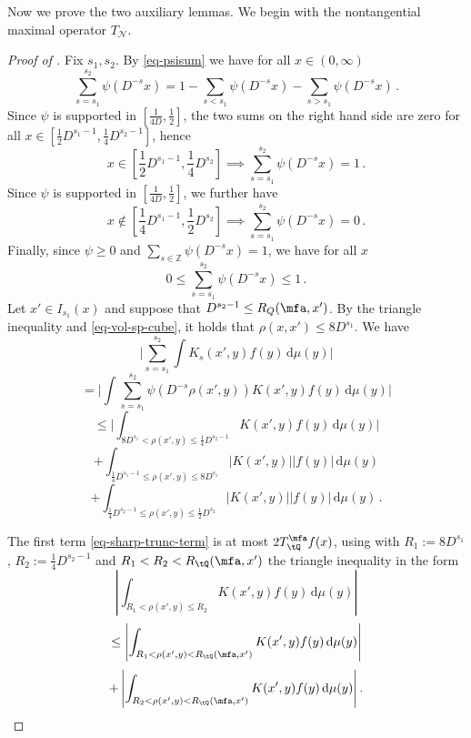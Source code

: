 Now we prove the two auxiliary lemmas. We begin with the nontangential maximal operator $T_{\mathcal{N}}$.

\begin{proof}[Proof of ]
    \leanok
    Fix $s_1, s_2$. By \eqref{eq-psisum} we have for all $x \in (0, \infty)$
    $$
        \sum_{s = s_1}^{s_2} \psi(D^{-s}x) = 1 - \sum_{s < s_1} \psi(D^{-s}x) - \sum_{s > s_1} \psi(D^{-s}x)\,.
    $$
    Since $\psi$ is supported in $[\frac{1}{4D}, \frac{1}{2}]$, the two sums on the right hand side are zero for all $x \in [\frac{1}{2}D^{s_1-1}, \frac{1}{4} D^{s_2 - 1}]$, hence
    $$
        x \in [\frac{1}{2}D^{s_1-1}, \frac{1}{4} D^{s_2}] \implies \sum_{s = s_1}^{s_2} \psi(D^{-s}x) = 1\,.
    $$
    Since $\psi$ is supported in $[\frac{1}{4D}, \frac{1}{2}]$, we further have
    $$
        x \notin [\frac{1}{4}D^{s_1 - 1}, \frac{1}{2}D^{s_2}] \implies \sum_{s = s_1}^{s_2} \psi(D^{-s}x) = 0\,.
    $$
    Finally, since $\psi \ge 0$ and $\sum_{s \in \mathbb{Z}} \psi(D^{-s}x) = 1$, we have for all $x$
    $$
        0 \le \sum_{s = s_1}^{s_2} \psi(D^{-s}x) \le 1\,.
    $$
    Let $x' \in I_{s_1}(x)$ and suppose that $D^{s_2 - 1} \le R_Q(\mfa, x')$. By the triangle inequality and \eqref{eq-vol-sp-cube}, it holds that $\rho(x,x') \le 8D^{s_1}$. We have
    $$
        \Bigg|\sum_{s = s_1}^{s_2} \int K_s(x',y) f(y) \, \mathrm{d}\mu(y)\Bigg|
    $$
    $$
        = \Bigg|\int \sum_{s = s_1}^{s_2} \psi(D^{-s}\rho(x',y)) K(x',y) f(y) \, \mathrm{d}\mu(y)\Bigg|
    $$
    \begin{equation}
        \label{eq-sharp-trunc-term}
        \le \Bigg| \int_{8D^{s_1} < \rho(x',y) \le \frac{1}{4}D^{s_2-1}} K(x',y) f(y) \, \mathrm{d}\mu(y) \Bigg|
    \end{equation}
    \begin{equation}
        \label{eq-lower-bound-term}
        + \int_{\frac{1}{4}D^{s_1-1} \le \rho(x',y) \le 8D^{s_1}} |K(x', y)| |f(y)| \, \mathrm{d}\mu(y)
    \end{equation}
    \begin{equation}
        \label{eq-upper-bound-term}
        + \int_{\frac{1}{4}D^{s_2-1} \le \rho(x',y) \le \frac{1}{2}D^{s_2}} |K(x', y)| |f(y)| \, \mathrm{d}\mu(y)\,.
    \end{equation}

    The first term \eqref{eq-sharp-trunc-term} is at most $2T_{\tQ}^\mfa f(x)$, using with $R_1 := 8D^{s_1}$, $R_2 := \frac{1}{4}D^{s_2-1}$ and $R_1 < R_2 < R_{\tQ}(\mfa,x')$ the triangle inequality in the form
    \begin{equation}
        \left|\int_{R_1 < \rho(x',y) \le R_2} K(x',y) f(y) \, \mathrm{d}\mu(y) \right|
    \end{equation}
    \begin{equation}
        \le \left|\int_{R_1 < \rho(x',y) < R_{\tQ}(\mfa,x')} K(x',y) f(y) \, \mathrm{d}\mu(y) \right|
    \end{equation}
    \begin{equation}
        + \left|\int_{R_2 < \rho(x',y) < R_{\tQ}(\mfa,x')} K(x',y) f(y) \, \mathrm{d}\mu(y) \right|.
    \end{equation}


\end{proof}
